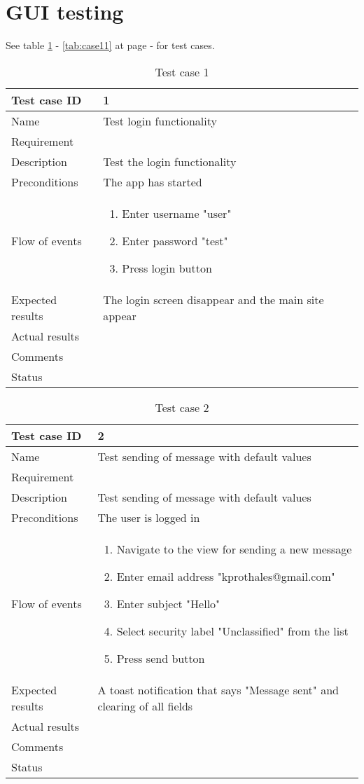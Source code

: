 
\section{GUI testing}

See table \ref{tab:case1} - \ref{tab:case11} at page \pageref{tab:case1} - \pageref{tab:case11} for test cases.
\begin{table}
\begin{tabular}{l|p{10cm}}
Test case ID & 1 \\ \hline
Name & Test login functionality\\ \hline
Requirement & \\ \hline
Description & Test the login functionality\\ \hline
Preconditions & The app has started\\ \hline
Flow of events & 
\begin{enumerate}
\item{}Enter username "user"
\item{}Enter password "test"
\item{}Press login button
\end{enumerate} \\ \hline
Expected results & The login screen disappear and the main site appear\\ \hline \hline
Actual results & \\ \hline
Comments & \\ \hline
Status & 
\end{tabular}
\caption{Test case 1} \label{tab:case1}
\end{table}

\begin{table}
\begin{tabular}{l|p{10cm}}
Test case ID & 2 \\ \hline
Name & Test sending of message with default values\\ \hline
Requirement & \\ \hline
Description & Test sending of message with default values\\ \hline
Preconditions & The user is logged in\\ \hline
Flow of events & 
\begin{enumerate}
\item{}Navigate to the view for sending a new message
\item{}Enter email address "kprothales@gmail.com"
\item{}Enter subject "Hello"
\item{}Select security label "Unclassified" from the list
\item{}Press send button
\end{enumerate} \\ \hline
Expected results & A toast notification that says "Message sent" and clearing of all fields\\ \hline \hline
Actual results & \\ \hline
Comments & \\ \hline
Status & 
\end{tabular}
\caption{Test case 2} \label{tab:case2}
\end{table}

